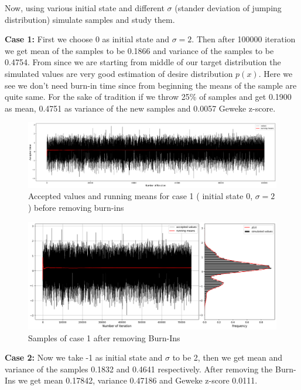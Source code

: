 \begin{example}
    Now, using various initial state and different $ \sigma $ (stander deviation of jumping distribution) simulate samples and study them. 

    \textbf{Case 1:} First we choose $ 0 $ as initial state and $ \sigma = 2 $. Then after 100000 iteration we get mean of the samples to be 0.1866 and variance of the samples to be 0.4754. 
        From  since we are starting from middle of our target distribution the simulated values are very good estimation of desire distribution $ p(x) $. Here we see we don't need burn-in time since from beginning the means of the sample are quite same. For the sake of tradition if we throw 25\% of samples and get 0.1900 as mean, 0.4751 as variance of the new samples and 0.0057 Geweke z-score. 

    \begin{figure}[H]
        \centering
        \includegraphics[width=1\textwidth]{./images/metropolis/sample-1-values.png}
        \caption{Accepted values and running means for case 1 ( initial state 0, $ \sigma = 2 $ ) before removing burn-ins}
        \label{fig:MH sample 1 values}
    \end{figure}

    \begin{figure}[H]
        \centering
        \includegraphics[width=1\textwidth]{./images/metropolis/sample-1-value-hist-bo.png}
        \caption{Samples of case 1 after removing Burn-Ins}
        \label{fig:MH sample 1 after burn-in}
    \end{figure}

    \textbf{Case 2:}  Now we take -1 as initial state and $ \sigma $ to be 2, then we get mean and variance of the samples 0.1832 and 0.4641 respectively. After removing the Burn-Ins we get mean 0.17842, variance 0.47186 and Geweke z-score 0.0111.


\end{example}
